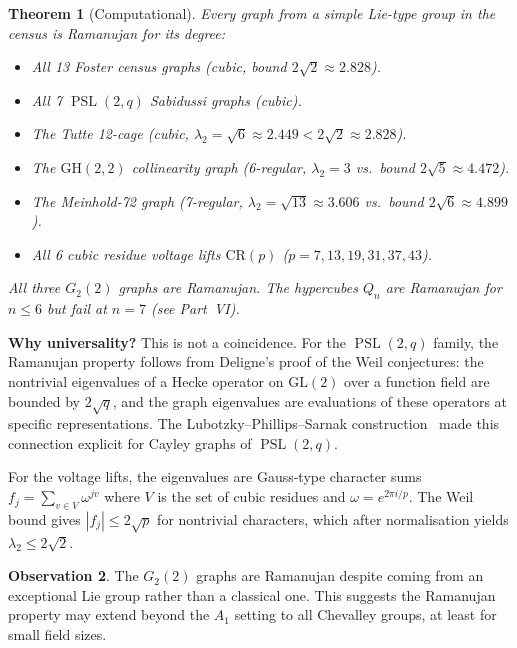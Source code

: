 \documentclass[11pt,a4paper]{article}
\theoremstyle{plain}
\newtheorem{theorem}{Theorem}[section]
\theoremstyle{definition}
\newtheorem{observation}[theorem]{Observation}
\theoremstyle{remark}
\newcommand{\PSL}{\operatorname{PSL}}
\newcommand{\GH}{\mathrm{GH}(2,2)}
\newcommand{\CR}{\mathrm{CR}}
\begin{document}
\begin{tcolorbox}[breakable, colback=black!5, colframe=black!5,
  boxrule=0pt, sharp corners]
\begin{theorem}[Computational]
\label{thm:all-ramanujan}
Every graph from a simple Lie-type group in the census is Ramanujan for its degree:
\begin{itemize}[noitemsep]
\item All 13 Foster census graphs (cubic, bound $2\sqrt{2} \approx 2.828$).
\item All 7 $\PSL(2,q)$ Sabidussi graphs (cubic).
\item The Tutte 12-cage (cubic, $\lambda_2 = \sqrt{6} \approx 2.449 < 2\sqrt{2} \approx 2.828$).
\item The $\GH$ collinearity graph (6-regular, $\lambda_2 = 3$
  vs.\ bound $2\sqrt{5} \approx 4.472$).
\item The Meinhold-72 graph (7-regular, $\lambda_2 = \sqrt{13} \approx 3.606$
  vs.\ bound $2\sqrt{6} \approx 4.899$).
\item All 6 cubic residue voltage lifts $\CR(p)$
  ($p = 7, 13, 19, 31, 37, 43$).
\end{itemize}
All three $G_2(2)$ graphs are Ramanujan. The hypercubes $Q_n$ are Ramanujan
for $n \le 6$ but fail at $n = 7$ (see Part~VI).
\end{theorem}
\end{tcolorbox}

\begin{tcolorbox}[breakable, colback=yellow!10, colframe=yellow!10,
  boxrule=0pt, sharp corners]
\textbf{Why universality?}
This is not a coincidence. For the $\PSL(2,q)$ family, the
Ramanujan property follows from Deligne's proof of the Weil conjectures:
the nontrivial eigenvalues of a Hecke operator on $\mathrm{GL}(2)$ over
a function field are bounded by $2\sqrt{q}$, and the graph eigenvalues
are evaluations of these operators at specific representations.
The Lubotzky--Phillips--Sarnak construction~\cite{LPS} made this
connection explicit for Cayley graphs of $\PSL(2,q)$.

For the voltage lifts, the eigenvalues are Gauss-type character sums
$f_j = \sum_{v \in V} \omega^{jv}$ where $V$ is the set of cubic residues
and $\omega = e^{2\pi i/p}$. The Weil bound gives
$|f_j| \le 2\sqrt{p}$ for nontrivial characters, which after normalisation
yields $\lambda_2 \le 2\sqrt{2}$.
\end{tcolorbox}

\begin{tcolorbox}[colback=black!5, colframe=black!5,
  boxrule=0pt, sharp corners]
\begin{observation}
The $G_2(2)$ graphs are Ramanujan despite coming from an exceptional Lie
group rather than a classical one. This suggests the Ramanujan property
may extend beyond the $A_1$ setting to all Chevalley groups, at least for
small field sizes.
\end{observation}
\end{tcolorbox}
\end{document}
